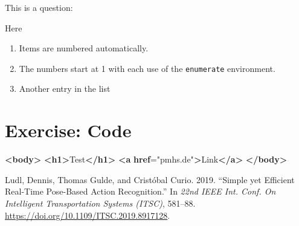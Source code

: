 \documentclass[12pt]{scrartcl}
\newenvironment{Shaded}{}{}
\newcommand{\ErrorTok}[1]{\textcolor[rgb]{1.00,0.00,0.00}{\textbf{#1}}}
\newcommand{\KeywordTok}[1]{\textcolor[rgb]{0.00,0.44,0.13}{\textbf{#1}}}
\newcommand{\NormalTok}[1]{#1}
\newcommand{\OtherTok}[1]{\textcolor[rgb]{0.00,0.44,0.13}{#1}}
\newcommand{\StringTok}[1]{\textcolor[rgb]{0.25,0.44,0.63}{#1}}
\newlength{\cslhangindent}
\newlength{\cslentryspacingunit} %
\newenvironment{CSLReferences}[2] %
 {%
  \setlength{\parindent}{0pt}
  \ifodd #1
  \let\oldpar\par
  \def\par{\hangindent=\cslhangindent\oldpar}
  \fi
  \setlength{\parskip}{#2\cslentryspacingunit}
 }%
 {}
\begin{document}
This is a question:


Here


\begin{enumerate}
  \item Items are numbered automatically.\\ 
  \item The numbers start at 1 with each use of the \texttt{enumerate} environment.
  \item Another entry in the list
\end{enumerate}

\hypertarget{exercise-code}{%
\section{Exercise: Code}\label{exercise-code}}

\begin{Shaded}
\begin{Highlighting}[]
\KeywordTok{\textless{}body\textgreater{}}
  \KeywordTok{\textless{}h1\textgreater{}}\NormalTok{Test}\KeywordTok{\textless{}/h1\textgreater{}}
  \KeywordTok{\textless{}a} \ErrorTok{href}\OtherTok{=}\StringTok{"pmhs.de"}\KeywordTok{\textgreater{}}\NormalTok{Link}\KeywordTok{\textless{}/a\textgreater{}}
\KeywordTok{\textless{}/body\textgreater{}}
\end{Highlighting}
\end{Shaded}

\hypertarget{refs}{}
\begin{CSLReferences}{1}{0}
\leavevmode{}%
Ludl, Dennis, Thomas Gulde, and Cristóbal Curio. 2019. {``Simple yet
Efficient Real-Time Pose-Based Action Recognition.''} In \emph{22nd
{IEEE Int}. {Conf}. On {Intelligent Transportation Systems} ({ITSC})},
581--88. \url{https://doi.org/10.1109/ITSC.2019.8917128}.

\end{CSLReferences}
\end{document}
